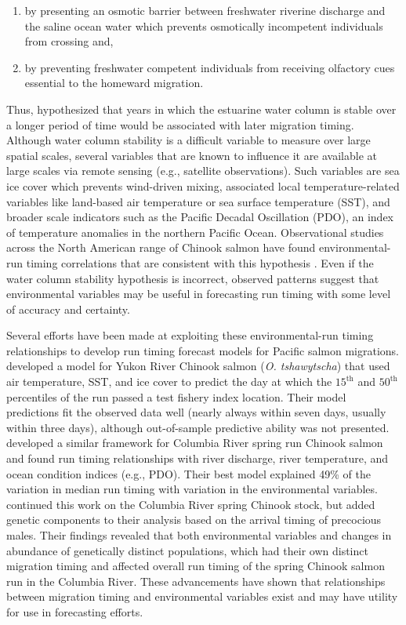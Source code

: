 \documentclass[12pt,]{book}
\theoremstyle{definition}
\theoremstyle{definition}
\theoremstyle{definition}
\theoremstyle{remark}
\begin{document}
\begin{enumerate}
\def\labelenumi{\arabic{enumi}.}
\item
  by presenting an osmotic barrier between freshwater riverine discharge
  and the saline ocean water which prevents osmotically incompetent
  individuals from crossing and,
\item
  by preventing freshwater competent individuals from receiving
  olfactory cues essential to the homeward migration.
\end{enumerate}

\noindent
Thus, \citet{mundy-evenson-2011} hypothesized that years in which the
estuarine water column is stable over a longer period of time would be
associated with later migration timing. Although water column stability
is a difficult variable to measure over large spatial scales, several
variables that are known to influence it are available at large scales
via remote sensing (e.g., satellite observations). Such variables are
sea ice cover which prevents wind-driven mixing, associated local
temperature-related variables like land-based air temperature or sea
surface temperature (SST), and broader scale indicators such as the
Pacific Decadal Oscillation (PDO), an index of temperature anomalies in
the northern Pacific Ocean. Observational studies across the North
American range of Chinook salmon have found environmental-run timing
correlations that are consistent with this hypothesis
\citep{hodgson-etal-2006, keefer-etal-2008, mundy-evenson-2011}. Even if
the water column stability hypothesis is incorrect, observed patterns
suggest that environmental variables may be useful in forecasting run
timing with some level of accuracy and certainty.

Several efforts have been made at exploiting these environmental-run
timing relationships to develop run timing forecast models for Pacific
salmon migrations. \citet{mundy-evenson-2011} developed a model for
Yukon River Chinook salmon (\emph{O. tshawytscha}) that used air
temperature, SST, and ice cover to predict the day at which the
\(15^{\text{th}}\) and \(50^{\text{th}}\) percentiles of the run passed
a test fishery index location. Their model predictions fit the observed
data well (nearly always within seven days, usually within three days),
although out-of-sample predictive ability was not presented.
\citet{keefer-etal-2008} developed a similar framework for Columbia
River spring run Chinook salmon and found run timing relationships with
river discharge, river temperature, and ocean condition indices (e.g.,
PDO). Their best model explained 49\% of the variation in median run
timing with variation in the environmental variables.
\citet{anderson-beer-2009} continued this work on the Columbia River
spring Chinook stock, but added genetic components to their analysis
based on the arrival timing of precocious males. Their findings revealed
that both environmental variables and changes in abundance of
genetically distinct populations, which had their own distinct migration
timing and affected overall run timing of the spring Chinook salmon run
in the Columbia River. These advancements have shown that relationships
between migration timing and environmental variables exist and may have
utility for use in forecasting efforts.
\end{document}
